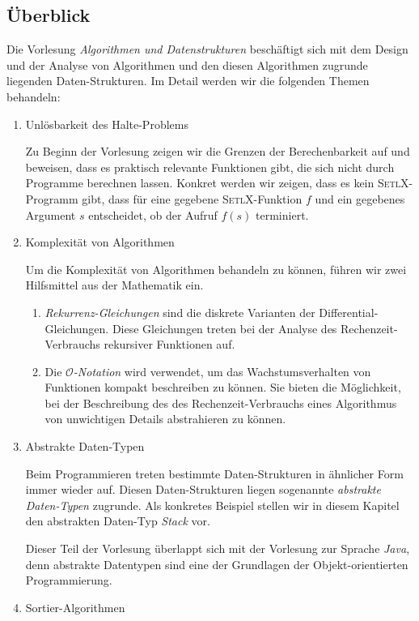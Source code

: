 \subsection{Überblick}
Die Vorlesung \emph{Algorithmen und Datenstrukturen} besch\"aftigt sich mit dem Design und
der Analyse von Algorithmen und den diesen Algorithmen zugrunde liegenden
Daten-Strukturen.  Im Detail werden wir die folgenden Themen behandeln:
\begin{enumerate}
\item Unl\"osbarkeit des Halte-Problems

      Zu Beginn der Vorlesung zeigen wir die Grenzen der Berechenbarkeit auf
      und beweisen, dass es praktisch relevante Funktionen gibt, die sich nicht durch
      Programme berechnen lassen.  Konkret werden wir zeigen, dass es kein \textsc{SetlX}-Programm
      gibt, dass f\"ur eine gegebene \textsc{SetlX}-Funktion $f$ und ein gegebenes Argument
      $s$ entscheidet, ob der Aufruf $f(s)$ terminiert.
\item Komplexit\"at von Algorithmen

      Um die Komplexit\"at von Algorithmen behandeln zu k\"onnen, f\"uhren wir zwei
      Hilfsmittel aus der Mathematik ein.
      \begin{enumerate}
      \item \emph{Rekurrenz-Gleichungen} sind die diskrete Varianten der
            Differential-Gleichungen.  Diese Gleichungen treten bei der Analyse
            des Rechenzeit-Verbrauchs rekursiver Funktionen auf.
      \item Die \emph{$\mathcal{O}$-Notation} wird verwendet, um das Wachstumsverhalten 
            von Funktionen kompakt beschreiben zu k\"onnen.  Sie bieten die M\"oglichkeit,
            bei der Beschreibung des des Rechenzeit-Verbrauchs eines Algorithmus von
            unwichtigen Details abstrahieren zu k\"onnen. 
      \end{enumerate}
\item Abstrakte Daten-Typen

      Beim Programmieren treten bestimmte Daten-Strukturen in \"ahnlicher Form
      immer wieder auf.  Diesen Daten-Strukturen liegen sogenannte
      \emph{abstrakte Daten-Typen} zugrunde.  Als konkretes Beispiel
      stellen wir in diesem Kapitel den abstrakten Daten-Typ \textsl{Stack} vor.

      Dieser Teil der Vorlesung \"uberlappt sich mit der Vorlesung zur Sprache \textsl{Java}, 
      denn abstrakte Datentypen sind eine der Grundlagen der Objekt-orientierten Programmierung.
\item Sortier-Algorithmen


\end{enumerate}
